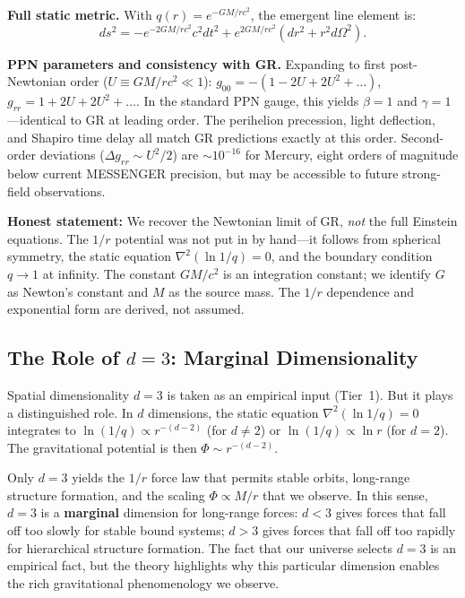 \documentclass[aps,prd,twocolumn,showpacs,superscriptaddress,preprintnumbers]{revtex4-2}
\begin{document}
\textbf{Full static metric.}
With $q(r) = e^{-GM/rc^2}$, the emergent line element is:
\begin{equation}
\boxed{ds^2 = -e^{-2GM/rc^2}c^2dt^2 + e^{2GM/rc^2}(dr^2 + r^2d\Omega^2)}.
\label{eq:metric}
\end{equation}

\textbf{PPN parameters and consistency with GR.}
Expanding to first post-Newtonian order ($U \equiv GM/rc^2 \ll 1$):
$g_{00} = -(1 - 2U + 2U^2 + \ldots)$, $g_{rr} = 1 + 2U + 2U^2 + \ldots$.
In the standard PPN gauge, this yields $\beta = 1$ and $\gamma = 1$---identical to GR at leading order.
The perihelion precession, light deflection, and Shapiro time delay all match GR predictions exactly at this order.
Second-order deviations ($\Delta g_{rr} \sim U^2/2$) are $\sim10^{-16}$ for Mercury, eight orders of magnitude below current MESSENGER precision, but may be accessible to future strong-field observations.

\textbf{Honest statement:} We recover the Newtonian limit of GR, \emph{not} the full Einstein equations.
The $1/r$ potential was not put in by hand---it follows from spherical symmetry, the static equation $\nabla^2(\ln 1/q)=0$, and the boundary condition $q\to1$ at infinity.
The constant $GM/c^2$ is an integration constant; we identify $G$ as Newton's constant and $M$ as the source mass.
The $1/r$ dependence and exponential form are derived, not assumed.

\subsection{The Role of $d=3$: Marginal Dimensionality}
\label{sec:d3}

Spatial dimensionality $d=3$ is taken as an empirical input (Tier~1).
But it plays a distinguished role.
In $d$ dimensions, the static equation $\nabla^2(\ln 1/q)=0$ integrates to $\ln(1/q)\propto r^{-(d-2)}$ (for $d\neq2$) or $\ln(1/q)\propto\ln r$ (for $d=2$).
The gravitational potential is then $\Phi\sim r^{-(d-2)}$.

Only $d=3$ yields the $1/r$ force law that permits stable orbits, long-range structure formation, and the scaling $\Phi\propto M/r$ that we observe.
In this sense, $d=3$ is a \textbf{marginal} dimension for long-range forces: $d<3$ gives forces that fall off too slowly for stable bound systems; $d>3$ gives forces that fall off too rapidly for hierarchical structure formation.
The fact that our universe selects $d=3$ is an empirical fact, but the theory highlights why this particular dimension enables the rich gravitational phenomenology we observe.
\end{document}
